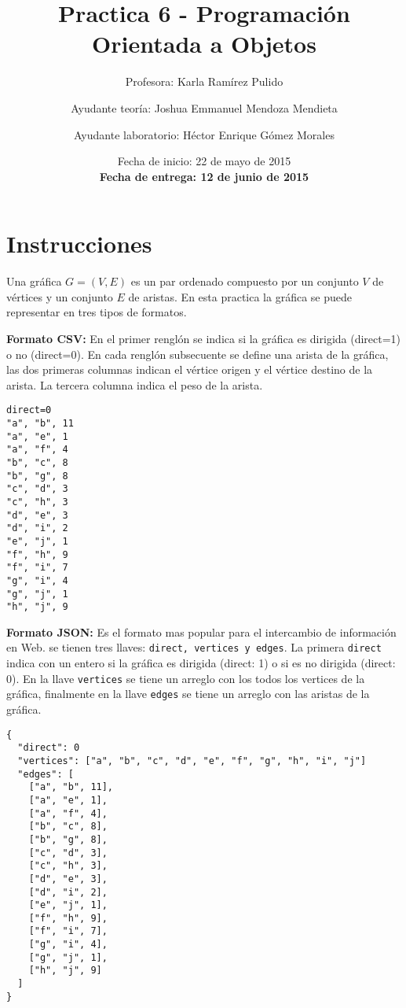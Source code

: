 \documentclass{article}
\author{Profesora: Karla Ramírez Pulido \and
  Ayudante teoría: Joshua Emmanuel Mendoza Mendieta \and
  Ayudante laboratorio: Héctor Enrique Gómez Morales}
\title{Practica 6 - Programación Orientada a Objetos}
\date{Fecha de inicio: 22 de mayo de 2015\\
  \textbf{Fecha de entrega: 12 de junio de 2015}}
\begin{document}
\maketitle
\section{Instrucciones}

Una gráfica $G = (V, E)$ es un par ordenado compuesto por un conjunto $V$ de vértices y un conjunto $E$ de aristas.
En esta practica la gráfica se puede representar en tres tipos de formatos.


\textbf{Formato CSV:} En el primer renglón se indica si la gráfica es dirigida (direct=1) o no (direct=0).
En cada renglón subsecuente se define una arista de la gráfica, las dos primeras columnas indican
el vértice origen y el vértice destino de la arista. La tercera columna indica el peso de la arista.

\begin{verbatim}
direct=0
"a", "b", 11
"a", "e", 1
"a", "f", 4
"b", "c", 8
"b", "g", 8
"c", "d", 3
"c", "h", 3
"d", "e", 3 
"d", "i", 2
"e", "j", 1
"f", "h", 9
"f", "i", 7
"g", "i", 4
"g", "j", 1
"h", "j", 9
\end{verbatim}


\textbf{Formato JSON:} Es el formato mas popular para el intercambio de información en Web. se tienen tres llaves: \texttt{direct, vertices y edges}. La primera \texttt{direct} indica con un entero si la gráfica es dirigida (direct: 1) o si es no dirigida (direct: 0). En la llave \texttt{vertices} se tiene un arreglo con los todos los vertices de la gráfica, finalmente en la llave \texttt{edges} se tiene un arreglo con las aristas de la gráfica. 

\begin{verbatim}
{
  "direct": 0
  "vertices": ["a", "b", "c", "d", "e", "f", "g", "h", "i", "j"]
  "edges": [
    ["a", "b", 11],
    ["a", "e", 1],
    ["a", "f", 4],
    ["b", "c", 8],
    ["b", "g", 8],
    ["c", "d", 3],
    ["c", "h", 3],
    ["d", "e", 3],
    ["d", "i", 2],
    ["e", "j", 1],
    ["f", "h", 9],
    ["f", "i", 7],
    ["g", "i", 4],
    ["g", "j", 1],
    ["h", "j", 9]
  ]
}
\end{verbatim}
\end{document}
